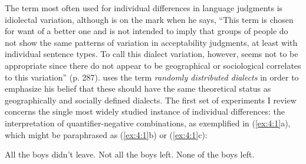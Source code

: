 \noindent The term most often used for individual differences in language judgments is idiolectal variation, although \citet{Heringer1970} is on the mark when he says, ``This term is chosen for want of a better one and is not intended to imply that groups of people do not show the same patterns of variation in acceptability judgments, at least with individual sentence types. To call this dialect variation, however, seems not to be appropriate since there do not appear to be geographical or
sociological correlates to this variation'' (p. 287). \citet{Carden1973} uses the term \textit{randomly distributed dialects} in order to emphasize his belief that these should have the same theoretical status as geographically and socially defined dialects. The first set of experiments I review concerns the single most widely studied instance of individual differences: the interpretation of quantifier-negative combinations, as exemplified in (\ref{ex:4:1}a), which might be paraphrased as (\ref{ex:4:1}b) or (\ref{ex:4:1}c):

\ea \label{ex:4:1}
\ea All the boys didn't leave. 
\ex Not all the boys left.
\ex None of the boys left.
\z
\z

